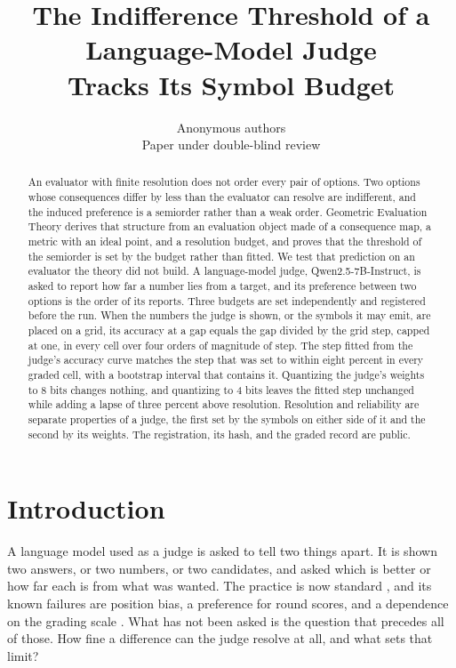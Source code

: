 \documentclass{article}
\title{The Indifference Threshold of a Language-Model Judge\\Tracks Its Symbol Budget}
\author{Anonymous authors\\Paper under double-blind review}
\theoremstyle{definition}
\theoremstyle{remark}
\begin{document}
\maketitle

\begin{abstract}
An evaluator with finite resolution does not order every pair of options.
Two options whose consequences differ by less than the evaluator can resolve are indifferent, and the induced preference is a semiorder rather than a weak order.
Geometric Evaluation Theory derives that structure from an evaluation object made of a consequence map, a metric with an ideal point, and a resolution budget, and proves that the threshold of the semiorder is set by the budget rather than fitted.
We test that prediction on an evaluator the theory did not build.
A language-model judge, Qwen2.5-7B-Instruct, is asked to report how far a number lies from a target, and its preference between two options is the order of its reports.
Three budgets are set independently and registered before the run.
When the numbers the judge is shown, or the symbols it may emit, are placed on a grid, its accuracy at a gap equals the gap divided by the grid step, capped at one, in every cell over four orders of magnitude of step.
The step fitted from the judge's accuracy curve matches the step that was set to within eight percent in every graded cell, with a bootstrap interval that contains it.
Quantizing the judge's weights to 8 bits changes nothing, and quantizing to 4 bits leaves the fitted step unchanged while adding a lapse of three percent above resolution.
Resolution and reliability are separate properties of a judge, the first set by the symbols on either side of it and the second by its weights.
The registration, its hash, and the graded record are public.
\end{abstract}

\section{Introduction}

A language model used as a judge is asked to tell two things apart.
It is shown two answers, or two numbers, or two candidates, and asked which is better or how far each is from what was wanted.
The practice is now standard \citep{zheng2023}, and its known failures are position bias, a preference for round scores, and a dependence on the grading scale \citep{li2026grading}.
What has not been asked is the question that precedes all of those.
How fine a difference can the judge resolve at all, and what sets that limit?
\end{document}
